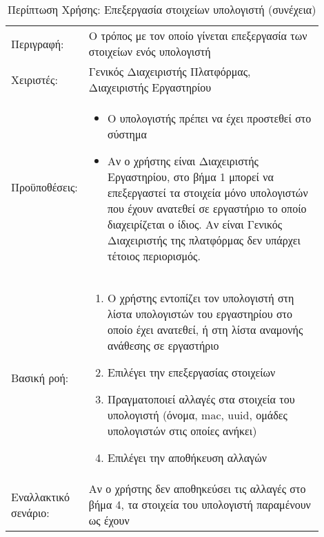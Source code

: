 %
%
\begin{longtable}{|p{0.14\linewidth}|p{0.76\linewidth}|}
	\caption{Περίπτωση Χρήσης: Επεξεργασία στοιχείων υπολογιστή} \label{tab:use-case-edit-computer} \\ \hline \endfirsthead
	\caption[{}]{Περίπτωση Χρήσης: Επεξεργασία στοιχείων υπολογιστή (συνέχεια)} \\ \endhead \endfoot
	Περιγραφή: & Ο τρόπος με τον οποίο γίνεται επεξεργασία των στοιχείων ενός υπολογιστή \\ \hline
	Χειριστές: & Γενικός Διαχειριστής Πλατφόρμας, Διαχειριστής Εργαστηρίου \\ \hline
	Προϋποθέσεις: &
	\begin{itemize}
		\vspace{-1cm}
		\addtolength{\itemindent}{-0.4cm}
		\item Ο υπολογιστής πρέπει να έχει προστεθεί στο σύστημα
		\item Αν ο χρήστης είναι Διαχειριστής Εργαστηρίου, στο βήμα 1 μπορεί να επεξεργαστεί τα στοιχεία μόνο υπολογιστών που έχουν ανατεθεί σε εργαστήριο το οποίο διαχειρίζεται ο ίδιος. Αν είναι Γενικός Διαχειριστής της πλατφόρμας δεν υπάρχει τέτοιος περιορισμός.
		\vspace{-0.7cm}
	\end{itemize} \\ \hline
	Βασική ροή: &
	\begin{enumerate}
		\vspace{-1cm}
		\addtolength{\itemindent}{-0.4cm}
		\item Ο χρήστης εντοπίζει τον υπολογιστή στη λίστα υπολογιστών του εργαστηρίου στο οποίο έχει ανατεθεί, ή στη λίστα αναμονής ανάθεσης σε εργαστήριο
		\item Επιλέγει την επεξεργασίας στοιχείων
		\item Πραγματοποιεί αλλαγές στα στοιχεία του υπολογιστή (όνομα, mac, uuid, ομάδες υπολογιστών στις οποίες ανήκει)
		\item Επιλέγει την αποθήκευση αλλαγών
		\vspace{-0.7cm}
	\end{enumerate} \\ \hline
	Εναλλακτικό σενάριο: & Αν ο χρήστης δεν αποθηκεύσει τις αλλαγές στο βήμα 4, τα στοιχεία του υπολογιστή παραμένουν ως έχουν \\ \hline
\end{longtable}

